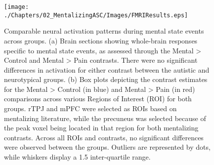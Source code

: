 \begin{figure}[!ht]
	\centering
    \texttt{[image: ./Chapters/02\_MentalizingASC/Images/FMRIResults.eps]}
	\caption{Comparable neural activation patterns during mental state events across groups. (a) Brain sections showing whole-brain responses specific to mental state events, as assessed through the Mental > Control and Mental > Pain contrasts. There were no significant differences in activation for either contrast between the autistic and neurotypical groups. (b) Box plots depicting the contrast estimates for the Mental > Control (in blue) and Mental > Pain (in red) comparisons across various Regions of Interest (ROI) for both groups. rTPJ and mPFC were selected as ROIs based on mentalizing literature, while the precuneus was selected because of the peak voxel being located in that region for both mentalizing contrasts. Across all ROIs and contrasts, no significant differences were observed between the groups. Outliers are represented by dots, while whiskers display a 1.5 inter-quartile range.}
    \vspace*{-10pt}
	\label{fig:fmri-results-asc}
\end{figure}


